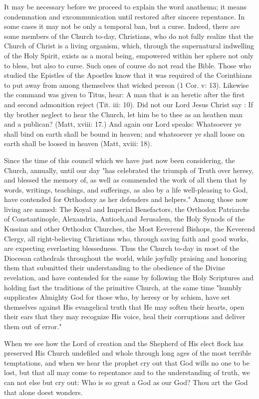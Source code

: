 It may be necessary before we proceed to explain
the word anathema; it means condemnation
and excommunication until restored after 
sincere repentance. In some cases it may not 
be only a temporal ban, but a curse. Indeed, 
there are some members of the Church to-day, 
Christians, who do not fully realize that the 
Church of Christ is a living organism, which, 
through the supernatural indwelling of the 
Holy Spirit, exists as a moral being, empowered
within her sphere not only to bless, but also to 
curse. Such ones of course do not read the 
Bible. Those who studied the Epistles of the 
Apostles know that it was required of the Corinthians
to put away from among themselves 
that wicked person (1 Cor. v: 13). Likewise the 
command was given to Titus, hear: A man that 
is an heretic after the first and second admonition
reject (Tit. iii: 10). Did not our Lord 
Jesus Christ say : If thy brother neglect to hear 
the Church, let him be to thee as an heathen 
man and a publican? (Matt, xviii: 17.) And 
again our Lord speaks: Whatsoever ye shall 
bind on earth shall be bound in heaven; and 
whatsoever ye shall loose on earth shall be 
loosed in heaven (Matt, xviii: 18). 

Since the time of this council which we have 
just now been considering, the Church, annually, 
until our day "has celebrated the triumph of 
Truth over heresy, and blessed the memory of, 
as well as commended the work of all them that 
by words, writings, teachings, and sufferings, as 
also by a life well-pleasing to God, have contended
for Orthodoxy as her defenders and 
helpers." Among those now living are named: 
The Koyal and Imperial Benefactors, the Orthodox
Patriarchs of Constantinople, Alexandria, 
Antioch,and Jerusalem, the Holy Synods of the
Kussian and other Orthodox Churches, the Most 
Eeverend Bishops, the Keverend Clergy, all 
right-believing Christians who, through saving 
faith and good works, are expecting everlasting 
blessedness. Thus the Church to-day in most 
of the Diocesan cathedrals throughout the 
world, while joyfully praising and honoring 
them that submitted their understanding to the 
obedience of the Divine revelation, and have 
contended for the same by following the Holy 
Scriptures and holding fast the traditions of the 
primitive Church, at the same time "humbly 
supplicates Almighty God for those who, by 
heresy or by schism, have set themselves against 
His evangelical truth that He may soften their 
hearts, open their ears that they may recognize 
His voice, heal their corruptions and deliver 
them out of error." 

When we see how the Lord of creation and 
the Shepherd of His elect flock has preserved 
His Church undefiled and whole through long 
ages of the most terrible temptations, and when 
we hear the prophet cry out that God wills 
no one to be lost, but that all may come to repentance
and to the understanding of truth, we 
can not else but cry out: Who is so great a 
God as our God? Thou art the God that alone 
doest wonders.
